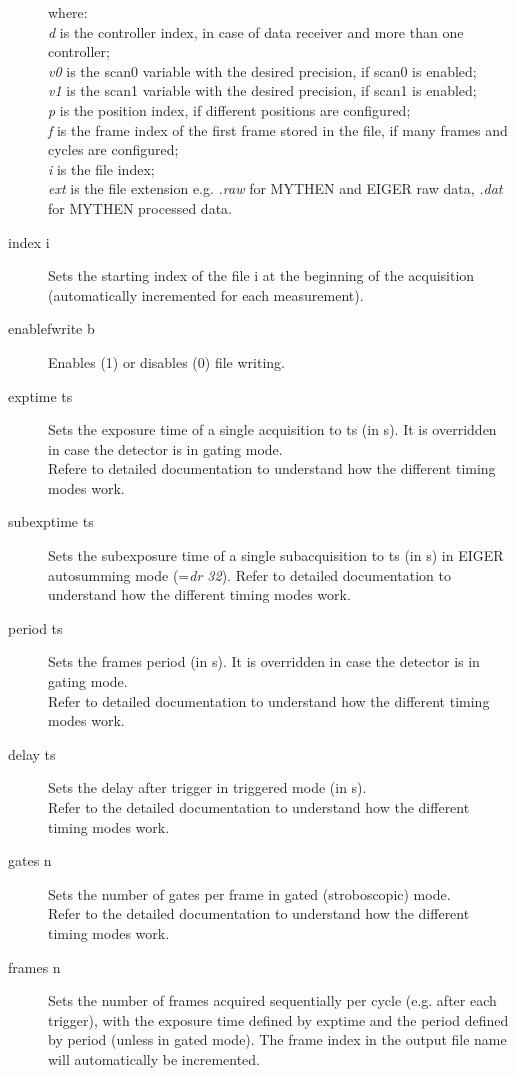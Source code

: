 \documentclass{article}
\newcommand{\E}{EIGER\xspace}
\begin{document}
\begin{description}
where: \\
\textit{d} is the controller index, in case of data receiver and more than one controller;\\
\textit{v0} is the scan0 variable with the desired precision, if scan0 is enabled;\\
\textit{v1} is the scan1 variable with the desired precision, if scan1 is enabled;\\
\textit{p} is the position index, if different positions are configured;\\
\textit{f} is the frame index of the first frame stored in the file, if many frames and cycles are configured;\\
\textit{i} is the file index;\\
\textit{ext} is the file extension e.g. \textit{.raw} for MYTHEN and \E raw data, \textit{.dat} for MYTHEN processed data.
\item[index i] Sets the starting index of the file i at the beginning of the acquisition (automatically incremented for each measurement).    
\item[enablefwrite b] Enables (1) or disables (0) file writing. 
\item[exptime ts] 
Sets the exposure time of a single acquisition to ts (in s). It is overridden in case the detector is in gating mode.  \\
Refere to detailed documentation to understand how the different timing modes work.
\item[subexptime ts] 
Sets the subexposure time of a single subacquisition to ts (in s) in \E autosumming mode (=\textit{dr 32}). Refer to detailed documentation to understand how the different timing modes work.
\item[period ts]  
Sets the frames period (in s). It is overridden in case the detector is in gating mode. \\
Refer to detailed documentation to understand how the different timing modes work. 
\item[delay ts] 
Sets the delay after trigger in triggered mode (in s).\\
Refer to the detailed documentation to understand how the different timing modes work.
\item[gates n] 
Sets the number of gates per frame in gated (stroboscopic) mode.\\
Refer to the detailed documentation to understand how the different timing modes work.
\item[frames n]  
Sets the number of frames acquired sequentially per cycle (e.g. after each trigger), with the exposure time defined by exptime and the period defined by period (unless in gated mode). The frame index in the output file name will automatically be incremented.\\

\end{description}
\end{document}
